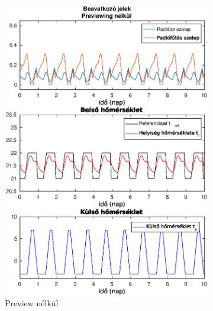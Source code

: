 \documentclass[14pt,handout]{beamer}
\begin{document}
\begin{frame}
\begin{figure}[H]
	\begin{subfigure}[t]{0.44\textwidth}
		\centering
		\includegraphics[trim=0 0 0 27, clip,width=\textwidth]{figures/onlab/compare/A_C_P0D0}
		\caption{\scriptsize Preview nélkül}
		\label{fig:mpc-pr0d0}
	\end{subfigure}
	~
	\begin{subfigure}[t]{0.47\textwidth}
		\centering

\end{subfigure}
\end{figure}
\end{frame}
\end{document}
